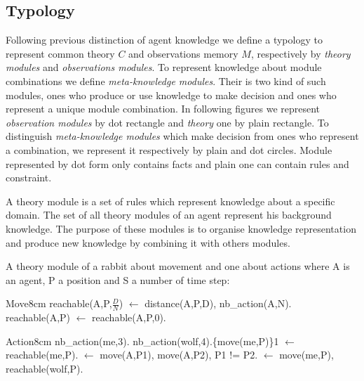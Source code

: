 \documentclass{aamas2012}
\begin{document}
\subsection{Typology}

	Following previous distinction of agent knowledge we define a typology to represent common theory $C$ and observations memory $M$,
	respectively by \emph{theory modules} and \emph{observations modules}.
	To represent knowledge about module combinations we define \emph{meta-knowledge modules}.
	Their is two kind of such modules, ones who produce or use knowledge to make decision and ones who represent a unique module combination.
	In following figures we represent \emph{observation modules} by dot rectangle and  \emph{theory} one by plain rectangle.
	To distinguish \emph{meta-knowledge modules} which make decision from ones who represent a combination, we represent it respectively by plain and dot circles.
	Module represented by dot form only contains facts and plain one can contain rules and constraint.

	\begin{definition}
		A theory module is a set of rules which represent knowledge about a specific domain.
		The set of all theory modules of an agent represent his background knowledge.
		The purpose of these modules is to organise knowledge representation and produce
		new knowledge by combining it with others modules.
	\end{definition}
	
	\begin{example}
		\label{theory_example}
		
		A theory module of a rabbit about movement and one about actions where A is an agent, P a position and S a number of time step:\newline
		\begin{module}{Move}{8cm}
			reachable(A,P,$\frac{D}{N}$) $\leftarrow$ distance(A,P,D), nb\_action(A,N).\newline
			reachable(A,P) $\leftarrow$ reachable(A,P,0).
		\end{module}
		
		\begin{module}{Action}{8cm}
			nb\_action(me,3).\newline
			nb\_action(wolf,4).\{move(me,P)\}1 $\leftarrow$ reachable(me,P).\newline
			$\leftarrow$ move(A,P1), move(A,P2), P1 != P2.\newline
			$\leftarrow$ move(me,P), reachable(wolf,P).
		\end{module}
		
	\end{example}
	
\end{document}
